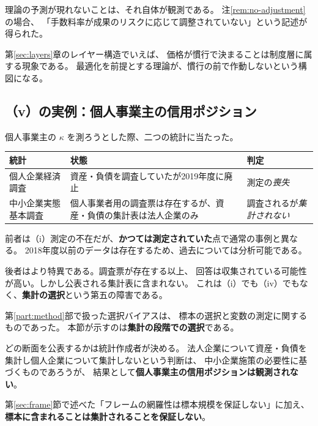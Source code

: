 \begin{remark}[（vi）は否定的な結果ではない]
理論の予測が現れないことは、それ自体が観測である。
注\ref{rem:no-adjustment}の場合、
「手数料率が成果のリスクに応じて調整されていない」という記述が得られた。

第\ref{sec:layers}章のレイヤー構造でいえば、
価格が慣行で決まることは制度層に属する現象である。
最適化を前提とする理論が、慣行の前で作動しないという構図になる。
\end{remark}

\subsection{（v）の実例：個人事業主の信用ポジション}
\label{sec:not-tabulated}

個人事業主の $\kappa$ を測ろうとした際、二つの統計に当たった。

\begin{center}
\begin{tabularx}{\textwidth}{@{}lXl@{}}
\toprule
統計 & 状態 & 判定 \\
\midrule
個人企業経済調査 & 資産・負債を調査していたが2019年度に廃止 & 測定の\emph{喪失} \\
中小企業実態基本調査 & 個人事業者用の調査票は存在するが、資産・負債の集計表は法人企業のみ & 調査されるが\emph{集計されない} \\
\bottomrule
\end{tabularx}
\label{tab:individual-kappa-stats}
\end{center}

前者は（i）測定の不在だが、\textbf{かつては測定されていた}点で通常の事例と異なる。
2018年度以前のデータは存在するため、過去については分析可能である。

後者はより特異である。調査票が存在する以上、
回答は収集されている可能性が高い。しかし公表される集計表に含まれない。
これは（i）でも（iv）でもなく、\textbf{集計の選択}という第五の障害である。

\begin{remark}[集計の選択が観測を規定する]
\label{rem:tabulation-choice}
第\ref{part:method}部で扱った選択バイアスは、
標本の選択と変数の測定に関するものであった。
本節が示すのは\textbf{集計の段階での選択}である。

どの断面を公表するかは統計作成者が決める。
法人企業について資産・負債を集計し個人企業について集計しないという判断は、
中小企業施策の必要性に基づくものであろうが、
結果として\textbf{個人事業主の信用ポジションは観測されない}。

第\ref{sec:frame}節で述べた「フレームの網羅性は標本規模を保証しない」に加え、
\textbf{標本に含まれることは集計されることを保証しない}。
\end{remark}



